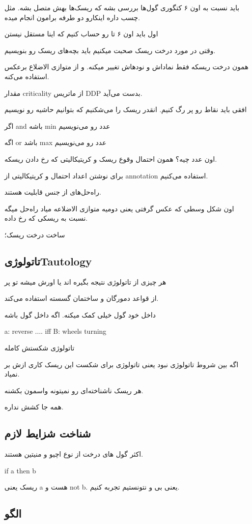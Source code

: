 باید نسبت به اون ۶ کتگوری گول‌ها بررسی بشه که ریسک‌ها بهش متصل بشه.
مثل چسب داره اینکارو دو طرفه برامون انجام میده.

اول باید اون ۶ تا رو حساب کنیم که اینا مستقل نیستن

وقتی در مورد درخت ریسک صحبت میکنیم باید بچه‌های ریسک رو بنویسیم.

همون درخت ریسکه فقط نماداش و نود‌هاش تغییر میکنه. و از متوازی الاضلاع برعکس
استفاده می‌کنه.

مقدار criticality از ماتریس DDP بدست می‌آید.

افقی باید نقاط رو پر رگ کنیم.
انقدر ریسک را می‌شکنیم که بتوانیم حاشیه رو نویسیم

اگر and باشه min عدد رو می‌نویسیم

اگه or باشد max عدد رو می‌نویسیم

اون عدد چیه؟ همون احتمال وقوع ریسک و کریتیکالیتی که رخ دادن ریسکه.

برای نوشتن اعداد احتمال و کریتیکالیتی از annotation استفاده می‌کنیم.

راه‌حل‌های از جنس قابلیت هستند.

اون شکل وسطی که عکس گرفتی یعنی دومیه متوازی الاضلاعه میاد راه‌حل میگه نسبت به
ریسکی که رخ داده.

ساخت درخت ریسک؛

\subsection{تاتولوژیTautology}

هر چیزی از تاتولوژی نتیجه بگیره اند یا اورش میشه تو پر

از قواعد دمورگان و ساختمان گسسته استفاده می‌کند.

داخل خود گول خیلی کمک میکنه. اگه داخل گول باشه

a: reverse .... iff B: wheels turning

تاتولوژی شکستش کامله

اگه بین شروط تاتولوژی نبود یعنی تاتولوژی برای شکست این ریسک کاری ازش بر نمیاد.

هر ریسک ناشناخته‌ای رو نمیتونه واسمون بکشنه.

همه جا کشش نداره.

\subsection{شناخت شزایط لازم}

اکثر گول ‌های درخت از نوع اچیو و منیتین هستند.

if a then b

ریسک یعنی a هست و not b. یعنی بی و نتونستیم تجربه کنیم.

\subsection{الگو}

